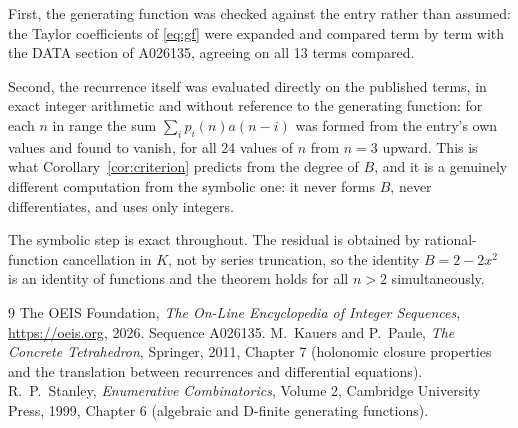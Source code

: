 \documentclass[11pt,a4paper]{article}
\theoremstyle{plain}
\theoremstyle{definition}
\begin{document}
First, the generating function was checked against the entry rather than assumed: the
Taylor coefficients of \eqref{eq:gf} were expanded and compared term by term with the DATA
section of A026135, agreeing on all 13 terms compared.

Second, the recurrence itself was evaluated directly on the published terms, in exact
integer arithmetic and without reference to the generating function: for each $n$ in range
the sum $\sum_{i}p_{i}(n)a(n-i)$ was formed from the entry's own values and found to
vanish, for all 24 values of $n$ from $n=3$ upward. This is what
Corollary~\ref{cor:criterion} predicts from the degree of $B$, and it is a genuinely
different computation from the symbolic one: it never forms $B$, never differentiates, and
uses only integers.

The symbolic step is exact throughout. The residual is obtained by rational-function
cancellation in $K$, not by series truncation, so the identity $B=2 - 2 x^{2}$ is an
identity of functions and the theorem holds for all $n>2$ simultaneously.

\begin{thebibliography}{9}
 The OEIS Foundation, \emph{The On-Line Encyclopedia of Integer Sequences},
\url{https://oeis.org}, 2026. Sequence A026135.
 M.~Kauers and P.~Paule, \emph{The Concrete Tetrahedron}, Springer, 2011,
Chapter 7 (holonomic closure properties and the translation between recurrences and
differential equations).
 R.~P.~Stanley, \emph{Enumerative Combinatorics}, Volume 2, Cambridge
University Press, 1999, Chapter 6 (algebraic and D-finite generating functions).
\end{thebibliography}
\end{document}
